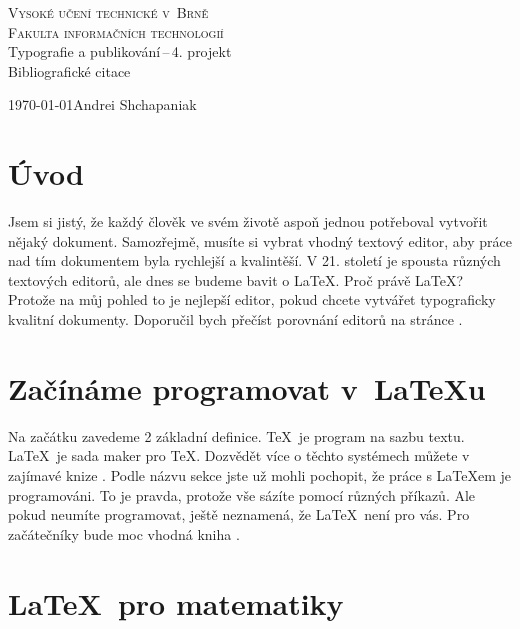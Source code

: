 \documentclass[a4paper, 11pt]{article}
\begin{document}
    \begin{titlepage}
        \begin{center}
            \Huge\textsc{Vysoké učení technické v~Brně} \\
            \huge\textsc{Fakulta informačních technologií} \\
            \LARGE{Typografie a publikování\,--\,4. projekt} \\
            \Huge{Bibliografické citace}
        \end{center} 
        {\Large \today \hfill Andrei Shchapaniak}
    \end{titlepage}
    
    \section{Úvod}
    
    Jsem si jistý, že každý člověk ve svém životě aspoň jednou potřeboval vytvořit nějaký dokument. Samozřejmě, musíte si vybrat vhodný textový editor, aby práce nad tím dokumentem byla rychlejší a kvalintěší. V 21. století je spousta různých textových editorů, ale dnes se budeme bavit o {\LaTeX}. Proč právě {\LaTeX}? Protože na můj pohled to je nejlepší editor, pokud chcete vytvářet typograficky kvalitní dokumenty. Doporučil bych přečíst porovnání editorů na stránce \cite{oestrem.com}.
    
    \section{Začínáme programovat v~{\LaTeX}u}
    
    Na začátku zavedeme 2 základní definice. 
    \TeX\ je program na sazbu textu. \LaTeX\ je sada maker pro \TeX.
    Dozvědět více o těchto systémech můžete v zajímavé knize \cite{book_2004}.
    Podle názvu sekce jste už mohli pochopit, že práce s {\LaTeX}em je programováni. To je pravda, protože vše sázíte pomocí různých příkazů. Ale pokud neumíte programovat, ještě neznamená, že \LaTeX\ není pro vás. Pro začátečníky bude moc vhodná kniha \cite{book_2011}.
    
    \section{\LaTeX\ pro matematiky}
    
\end{document}
